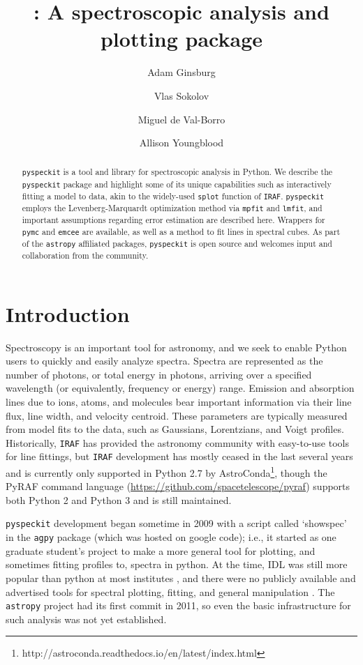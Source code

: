\documentclass[twocolumn]{aastex62}
\newcommand{\pyspeckit}{\texttt{pyspeckit}\xspace}
\newcommand{\astropy}{\texttt{astropy}\xspace}
\begin{document}
\title{{:} A spectroscopic analysis and plotting package}

\author[0000-0001-6431-9633]{Adam Ginsburg}

\author{Vlas Sokolov}
\author{Miguel de Val-Borro}
\author{Allison Youngblood}



\begin{abstract}
\pyspeckit is a tool and library for spectroscopic analysis in Python. We
describe the \pyspeckit package and highlight some of its unique capabilities
such as interactively fitting a model to data, akin to the widely-used
\texttt{splot} function of \texttt{IRAF}. \pyspeckit employs the
Levenberg-Marquardt optimization method via \texttt{mpfit} and \texttt{lmfit},
and important assumptions regarding error estimation are described here.
Wrappers for \texttt{pymc} and \texttt{emcee} are available, as well as a
method to fit lines in spectral cubes. As part of the \astropy affiliated
packages, \pyspeckit is open source and welcomes input and collaboration from
the community.
\end{abstract}


\section{Introduction}
Spectroscopy is an important tool for astronomy, and we seek to enable Python users
to quickly and easily analyze spectra.  Spectra are represented as
the number of photons, or total energy in photons, arriving over a specified
wavelength (or equivalently, frequency or energy) range. Emission and 
absorption lines due to ions, atoms, and molecules bear important information
via their line flux, line width, and velocity centroid. These parameters are
typically measured from model fits to the data, such as Gaussians, Lorentzians,
and Voigt profiles. Historically, \texttt{IRAF} has provided the astronomy
community with easy-to-use tools for line fittings, but \texttt{IRAF}
development has mostly ceased in the last several years and is currently only
supported in Python 2.7 by
AstroConda\footnote{http://astroconda.readthedocs.io/en/latest/index.html},
though the PyRAF command language
(\url{https://github.com/spacetelescope/pyraf}) supports both Python 2 and
Python 3 and is still maintained.


\pyspeckit development began sometime in 2009 with a script called `showspec'
in the \texttt{agpy} package (which was hosted on google code); i.e., it
started as one graduate student's project to make a more general tool for
plotting, and sometimes fitting profiles to, spectra in python.  At the time,
IDL was still more popular than python at most institutes \citep[first evidence
that python had overtaken IDL in popularity among astronomers was presented in
]{Momcheva2015a}, and there were no publicly available and advertised tools for
spectral plotting, fitting, and general manipulation \cite[\texttt{astropysics}
was developed contemporaneously and solved many of the same problems as
\pyspeckit][]{Tollerud2012a}.  The \astropy project had its first commit in
2011, so even the basic infrastructure for such analysis was not yet
established.
\end{document}
